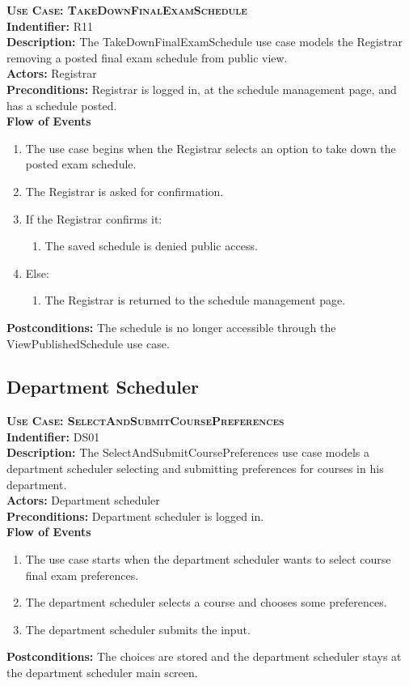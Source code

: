 \documentclass[11pt]{article}
\newenvironment{usecase}{%
	\def\title##1{ {\large \bfseries  \scshape {Use Case:} ##1} \\ }
 	\def\id##1{{\bf Indentifier:} ##1\\}
	\def\des##1{ {\bf Description:} ##1\\}
	\def\actors##1{ {\bf Actors:} ##1\\}
    	\def\pre##1{ {\bf Preconditions:} ##1 \\} %
    	\def\flow##1{ {\bf Flow of Events} ##1}%
    	\newenvironment{ucenum}{%
        	\begin{enumerate}[nolistsep]\small}%
        	{\end{enumerate}}
	\def\post##1{ {\bf Postconditions:} ##1 \\}
}{\vspace{.05in}}
\begin{document}
\begin{usecase}
  \title{TakeDownFinalExamSchedule}
  \id{R11}
  \des{The TakeDownFinalExamSchedule use case models the Registrar removing a posted final exam schedule from public view.}
  \actors{Registrar}
  \pre{Registrar is logged in, at the schedule management page, and has a schedule posted.}
  \flow{}
  \begin{ucenum}
  \item The use case begins when the Registrar selects an option to take down the posted exam schedule.
  \item The Registrar is asked for confirmation.
  \item If the Registrar confirms it:
    \begin{ucenum} \item The saved schedule is denied public access. \end{ucenum}
  \item Else:
    \begin{ucenum} \item The Registrar is returned to the schedule management page. \end{ucenum}
  \end{ucenum}
  \post{The schedule is no longer accessible through the ViewPublishedSchedule use case.}
\end{usecase}

\subsection{Department Scheduler}
\begin{usecase}
  \title{SelectAndSubmitCoursePreferences}
  \id{DS01}
  \des{The SelectAndSubmitCoursePreferences use case models a department scheduler selecting and submitting preferences for courses in his department.}
  \actors{Department scheduler}
  \pre{Department scheduler is logged in.}
  \flow{}
  \begin{ucenum}
  \item The use case starts when the department scheduler wants to select course final exam preferences.
  \item The department scheduler selects a course and chooses some preferences.
  \item The department scheduler submits the input.
  \end{ucenum}
  \post{The choices are stored and the department scheduler stays at the department scheduler main screen.}
\end{usecase}
\end{document}
